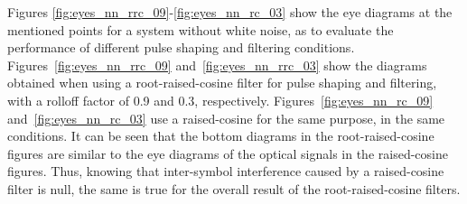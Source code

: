 Figures \ref{fig:eyes_nn_rrc_09}-\ref{fig:eyes_nn_rc_03} show the eye diagrams at the mentioned points for a system without white noise, as to evaluate the performance of different pulse shaping and filtering conditions. Figures~\ref{fig:eyes_nn_rrc_09} and~\ref{fig:eyes_nn_rrc_03} show the diagrams obtained when using a root-raised-cosine filter for pulse shaping and filtering, with a rolloff factor of 0.9 and 0.3, respectively. Figures~\ref{fig:eyes_nn_rc_09} and~\ref{fig:eyes_nn_rc_03} use a raised-cosine for the same purpose, in the same conditions. It can be seen that the bottom diagrams in the root-raised-cosine figures are similar to the eye diagrams of the optical signals in the raised-cosine figures. Thus, knowing that inter-symbol interference caused by a raised-cosine filter is null, the same is true for the overall result of the root-raised-cosine filters.

